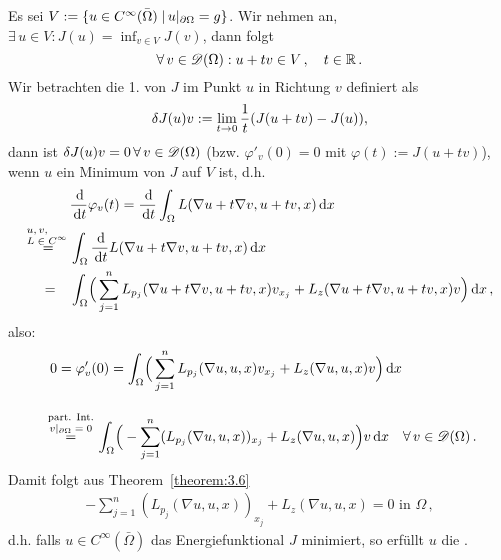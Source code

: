 Es sei $V:=\{u \in C^\infty (\bar\Omega) \;\vert\, u |_{\partial \Omega} = g \}$. Wir nehmen an,  $\exists \, u \in V: J(u) = \inf_{v \in V} J(v)$, dann folgt
\[
	\forall \, v \in \mathscr{D} (\Omega) : u + tv \in V \, ,  \quad t \in \mathbb{R} \, .
\]
Wir betrachten die 1.  von $J$ im Punkt $u$ in Richtung $v$ definiert als
\[
	\delta J(u) v := \lim_{t\rightarrow 0} \frac 1 t (J(u+tv)-J(u)) ,
\]
dann ist $\delta J(u) v = 0 \, \forall \, v \in \mathscr{D}(\Omega)$ (bzw. $\varphi'_v (0) = 0$ mit $\varphi(t) := J(u+tv)$), wenn $u$ ein Minimum von $J$ auf $V$ ist, d.h.
\begin{align*}
&\frac \d {\d t} \varphi_v (t)  = \frac \d{\d t} \int_\Omega L(\nabla u + t \nabla v, u+tv, x) \d x \\
			 \stackrel{\parbox{1.077cm}{\scriptsize$u,v$, \\ $L \in C^\infty$}}=& \int_\Omega \frac \d{\d t} L(\nabla u + t \nabla v, u+tv, x) \d x \\
			=\quad & \int_\Omega \Bigr(\sum_{j=1}^n L_{p_j} (\nabla u + t \nabla v, u+tv, x) v_{x_j} + L_z(\nabla u + t \nabla v, u+tv, x) v \Bigr) \d x \, ,
\end{align*}
also:
\begin{align*}
& \ \,  0  =  \varphi'_v(0) = \int_\Omega \Bigr( \sum_{j=1}^n L_{p_j} (\nabla u, u , x) v_{x_j} + L_z (\nabla u, u, x) v\Bigr) \d x \\
&\stackrel{\parbox{1.2cm}{\center\scriptsize part. Int. \\ $v|_{\partial\Omega} = 0$}}= \int_\Omega \Bigr(-\sum_{j=1}^n(L_{p_j} (\nabla u, u, x))_{x_j} + L_z(\nabla u, u, x)\Bigr) v \d x \quad \fa \, v \in \D(\Omega) \, .
\end{align*}
Damit folgt aus Theorem~\ref{theorem:3.6}
\begin{align*}
\label{eq:ELG}
\tag{ELG} -\sum_{j=1}^n(L_{p_j} (\nabla u, u, x))_{x_j} + L_z(\nabla u, u, x) = 0 \text{ in } \Omega \, ,
\end{align*}
d.h. falls $u \in C^\infty (\bar\Omega)$ das Energiefunktional $J$ minimiert, so erfüllt $u$ die .


